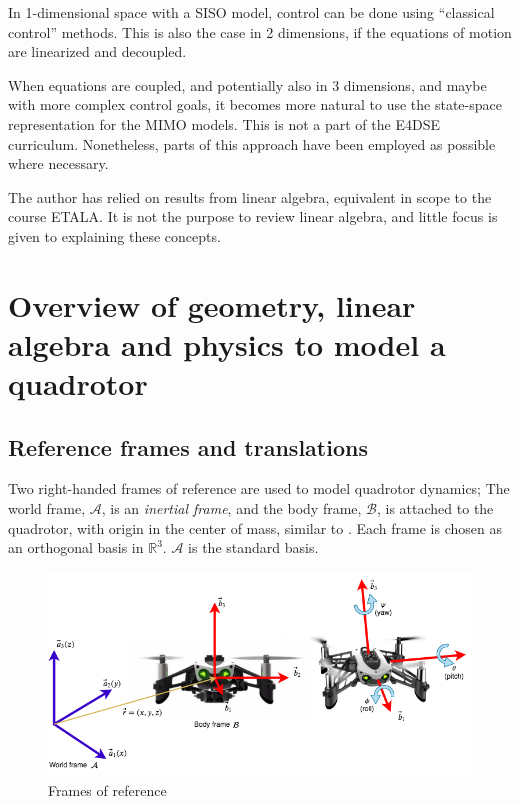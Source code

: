 \documentclass[a4paper]{report}
\begin{document}
In 1-dimensional space with a \gls{SISO} model, control can be done using ``classical control'' methods. 
This is also the case in 2 dimensions, if the equations of motion are linearized and decoupled. 

When equations are coupled, and potentially also in 3 dimensions, and maybe with more complex control goals, it becomes more natural to use the state-space representation for the \gls{MIMO} models. This is not a part of the E4DSE curriculum. 
Nonetheless, parts of this approach have been employed as possible where necessary.

The author has relied on results from linear algebra, equivalent in scope to the course ETALA. It is not the purpose to review linear algebra, and little focus is given to explaining these concepts.


\chapter{Overview of geometry, linear algebra and physics to model a quadrotor}

\section{Reference frames and translations}
Two right-handed frames of reference are used to model quadrotor dynamics; 
The world frame, $\mathcal{A}$, is an \textit{inertial frame}, and the body frame, $\mathcal{B}$, is attached to the quadrotor, with origin in the center of mass, similar to \cite[p. 310]{Powers2015}.
Each frame is chosen as an orthogonal basis in $\mathbb{R}^3$. $\mathcal{A}$ is the standard basis.

\begin{figure}[H]
\centering
\includegraphics[width=14cm]{img/frames.png}
\caption{Frames of reference\label{fig:frames}}
\end{figure}
\end{document}
